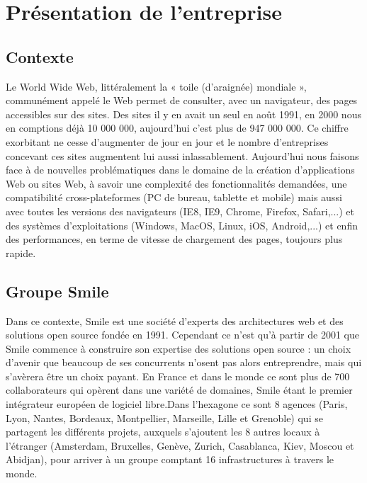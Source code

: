 \documentclass[a4paper,11pt,twoside]{report}
\begin{document}
\tableofcontents

\chapter{Présentation de l'entreprise}
  \section{Contexte}
  Le World Wide Web, littéralement la « toile (d’araignée) mondiale », communément appelé le Web permet de consulter, avec un navigateur, des pages accessibles sur des sites. Des sites il y en avait un seul en août 1991, en 2000 nous en comptions déjà 10 000 000, aujourd'hui c'est plus de 947 000 000. Ce chiffre exorbitant ne cesse d'augmenter de jour en jour et le nombre d'entreprises concevant ces sites augmentent lui aussi inlassablement. Aujourd'hui nous faisons face à de nouvelles problématiques dans le domaine de la création d'applications Web ou sites Web, à savoir une complexité des fonctionnalités demandées, une compatibilité cross-plateformes (PC de bureau, tablette et mobile) mais aussi avec toutes les versions des navigateurs (IE8, IE9, Chrome, Firefox, Safari,...) et des systèmes d'exploitations (Windows, MacOS, Linux, iOS, Android,...) et enfin des performances, en terme de vitesse de chargement des pages, toujours plus rapide.
  
  \section{Groupe Smile}
  Dans ce contexte, Smile est une société d'experts des architectures web et des solutions open source fondée en 1991. Cependant ce n'est qu'à partir de 2001 que Smile commence à construire son expertise des solutions open source : un choix d’avenir que beaucoup de ses concurrents n’osent pas alors entreprendre, mais qui s'avèrera être un choix payant. En France et dans le monde ce sont plus de 700 collaborateurs qui opèrent dans une variété de domaines, Smile étant le premier intégrateur européen de logiciel libre.Dans l'hexagone ce sont 8 agences (Paris, Lyon, Nantes, Bordeaux, Montpellier, Marseille, Lille et Grenoble) qui se partagent les différents projets, auxquels s'ajoutent les 8 autres locaux à l'étranger (Amsterdam, Bruxelles, Genève, Zurich, Casablanca, Kiev, Moscou et Abidjan), pour arriver à un groupe comptant 16 infrastructures à travers le monde.\newline
\end{document}

